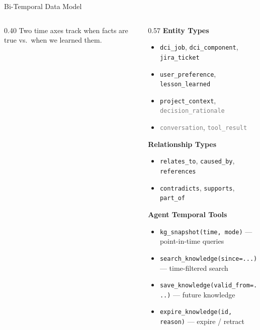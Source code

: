 \documentclass[aspectratio=169,10pt]{beamer}
\begin{document}
\begin{frame}[fragile]{Bi-Temporal Data Model}
\begin{columns}[T]
\begin{column}{0.40\textwidth}
\smallskip
{\scriptsize\color{gray} Two time axes track \textcolor{rhred}{when facts are true} vs.\ \textcolor{rhblue}{when we learned them}.}
\end{column}
\begin{column}{0.57\textwidth}
\textbf{Entity Types}
\begin{itemize}\scriptsize
  \item \textcolor{rhred}{\texttt{dci\_job}}, \textcolor{rhred}{\texttt{dci\_component}}, \textcolor{rhorange}{\texttt{jira\_ticket}}
  \item \textcolor{rhgreen}{\texttt{user\_preference}}, \textcolor{rhpurple}{\texttt{lesson\_learned}}
  \item \textcolor{rhteal}{\texttt{project\_context}}, \textcolor{gray}{\texttt{decision\_rationale}}
  \item \textcolor{gray}{\texttt{conversation}}, \textcolor{gray}{\texttt{tool\_result}}
\end{itemize}
\smallskip
\textbf{Relationship Types}
\begin{itemize}\scriptsize
  \item \texttt{relates\_to}, \texttt{caused\_by}, \texttt{references}
  \item \texttt{contradicts}, \texttt{supports}, \texttt{part\_of}
\end{itemize}
\smallskip
\textbf{Agent Temporal Tools}
\begin{itemize}\scriptsize
  \item \texttt{kg\_snapshot(time, mode)} --- point-in-time queries
  \item \texttt{search\_knowledge(since=...)} --- time-filtered search
  \item \texttt{save\_knowledge(valid\_from=...)} --- future knowledge
  \item \texttt{expire\_knowledge(id, reason)} --- expire / retract
\end{itemize}
\end{column}
\end{columns}
\end{frame}
\end{document}

